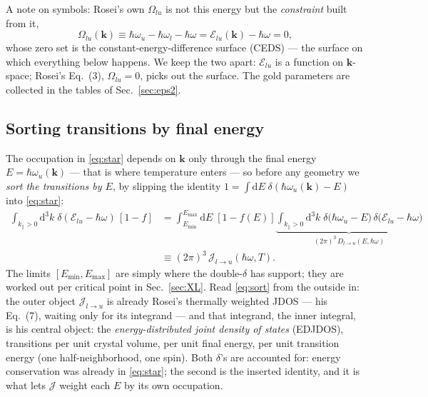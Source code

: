 \documentclass[11pt,a4paper]{article}
\numberwithin{equation}{section}
\begin{document}
A note on symbols: Rosei's own $\Omega_{lu}$ is not this energy but
the \emph{constraint} built from it,
\begin{equation}
\Omega_{lu}(\mathbf k)\equiv
\hbar\omega_u-\hbar\omega_l-{\hbar\omega}={\mathcal{E}_{lu}}(\mathbf k)-{\hbar\omega}=0,
\tag{3}
\label{eq:CEDS}
\end{equation}
whose zero set is the constant-energy-difference surface (CEDS) ---
the surface on which everything below happens.  We keep the two
apart: ${\mathcal{E}_{lu}}$ is a function on $\mathbf k$-space; Rosei's Eq.~(3),
$\Omega_{lu}=0$, picks out the surface.  The gold parameters are
collected in the tables of Sec.~\ref{sec:eps2}.

\subsection{Sorting transitions by final energy}
\label{sec:sort}

The occupation in \eqref{eq:star} depends on $\mathbf k$ only through
the final energy $E=\hbar\omega_u(\mathbf k)$ --- that is where
temperature enters --- so before any geometry we \emph{sort the
transitions by $E$}, by slipping the identity
$1=\int{\mathrm{d}} E\;\delta(\hbar\omega_u(\mathbf k)-E)$ into \eqref{eq:star}:
\begin{equation}
\begin{aligned}
\int_{{k_{\parallel}}>0}\!\!{\mathrm{d}}^3k\;\delta({\mathcal{E}_{lu}}-{\hbar\omega})\,[1-{f}]
&=\int_{E_{\min}}^{E_{\max}}\!\!{\mathrm{d}} E\;[1-{f}(E)]
\underbrace{\int_{{k_{\parallel}}>0}\!\!{\mathrm{d}}^3k\;
\delta\bigl(\hbar\omega_u-E\bigr)\,
\delta\bigl({\mathcal{E}_{lu}}-{\hbar\omega}\bigr)}_{(2\pi)^3\,{D_{l\to u}}(E,{\hbar\omega})}\\[2pt]
&\equiv(2\pi)^3\,{\mathcal{J}}_{l\to u}({\hbar\omega},T) .
\end{aligned}
\label{eq:sort}
\end{equation}
The limits $[E_{\min},E_{\max}]$ are simply where the double-$\delta$
has support; they are worked out per critical point in
Sec.~\ref{sec:XL}.  Read \eqref{eq:sort} from the outside in: the
outer object ${\mathcal{J}}_{l\to u}$ is already Rosei's thermally weighted JDOS
--- his Eq.~(7), waiting only for its integrand --- and that integrand,
the inner integral, is his central object: the
\emph{energy-distributed joint density of states} (EDJDOS),
transitions per unit crystal volume, per unit final energy, per unit
transition energy (one half-neighborhood, one spin).  Both $\delta$'s
are accounted for: energy conservation was already in \eqref{eq:star};
the second is the inserted identity, and it is what lets ${\mathcal{J}}$ weight
each $E$ by its own occupation.
\end{document}
